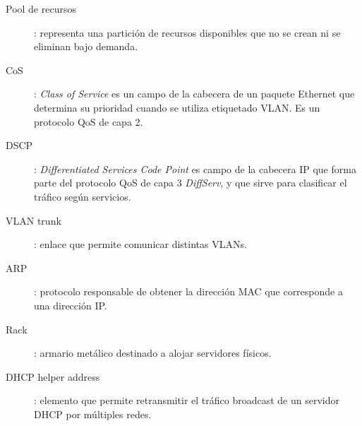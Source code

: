 \begin{description}
 \label{itm:cpd}
 \item [Pool de recursos]: representa una partición de recursos disponibles que no se crean ni se eliminan bajo demanda.
 \label{itm:poolResources}
  \item [CoS]: \textit{Class of Service} es un campo de la cabecera de un paquete Ethernet que determina su prioridad cuando se utiliza etiquetado VLAN. Es un protocolo QoS de capa 2.
 \label{itm:cos}
  \item [DSCP]: \textit{Differentiated Services Code Point} es campo de la cabecera IP que forma parte del protocolo QoS de capa 3 \textit{DiffServ}, y que sirve para clasificar el tráfico según servicios.
 \label{itm:dscp}
  \item [VLAN trunk]: enlace que permite comunicar distintas VLANs.
 \label{itm:trunk}
  \item [ARP]: protocolo responsable de obtener la dirección MAC que corresponde a una dirección IP.
 \label{itm:arp}
  \item [Rack]: armario metálico destinado a alojar servidores físicos.
 \label{itm:rack}
  \item [DHCP helper address]: elemento que permite retransmitir el tráfico broadcast de un servidor DHCP por múltiples redes.
 \label{itm:dhcpHelper}
\end{description}
